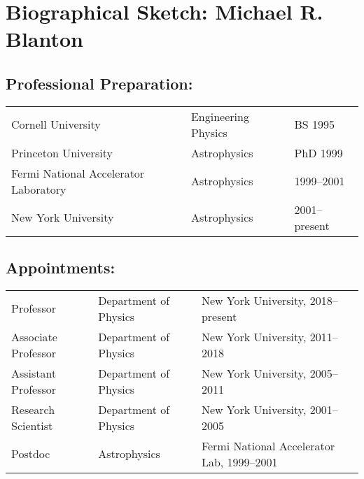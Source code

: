 \documentclass[12pt, preprint]{hacked-aastex}
\begin{document}
\clearpage
\section{Biographical Sketch: Michael R. Blanton}\label{sec:bio}

\vspace{-0.1in}
\subsection*{\normalsize Professional Preparation:}
\begin{tabular}{@{}l@{\qquad}l@{\qquad}l}
Cornell University & Engineering Physics & BS 1995\\
Princeton University & Astrophysics & PhD 1999\\
Fermi National Accelerator Laboratory & Astrophysics & 1999--2001\\
New York University & Astrophysics & 2001--present
\end{tabular}
           
\vspace{-0.1in}
\subsection*{\normalsize Appointments:}
\begin{tabular}{@{}l@{\qquad}l@{\qquad}l}
Professor & Department of Physics & New York University,
2018--present\\
Associate Professor & Department of Physics & New York University,
2011--2018\\
Assistant Professor & Department of Physics & New York University,
2005--2011\\
Research Scientist & Department of Physics & New York University,
2001--2005\\
Postdoc & Astrophysics & Fermi National Accelerator Lab, 1999--2001
\end{tabular}

\vspace{-0.1in}
\end{document}
